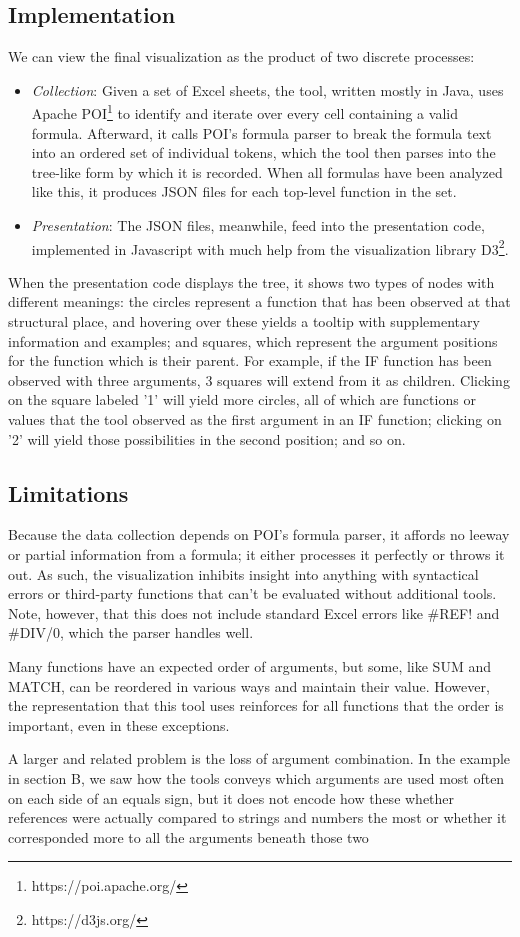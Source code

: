 \documentclass[conference]{IEEEtran}
\begin{document}
\subsection{Implementation}
We can view the final visualization as the product of two discrete processes:
\begin{itemize}
	\item \textit{Collection}: Given a set of Excel sheets, the tool, written mostly in Java, uses Apache POI\footnote{https://poi.apache.org/} to identify and iterate over every cell containing a valid formula. Afterward, it calls POI's formula parser to break the formula text into an ordered set of individual tokens, which the tool then parses into the tree-like form by which it is recorded. When all formulas have been analyzed like this, it produces JSON files for each top-level function in the set.
	\item \textit{Presentation}: The JSON files, meanwhile, feed into the presentation code, implemented in Javascript with much help from the visualization library D3\footnote{https://d3js.org/}. 
\end{itemize}
When the presentation code displays the tree, it shows two types of nodes with different meanings: the circles represent a function that has been observed at that structural place, and hovering over these yields a tooltip with supplementary information and examples; and squares, which represent the argument positions for the function which is their parent. For example, if the IF function has been observed with three arguments, 3 squares will extend from it as children. Clicking on the square labeled '1' will yield more circles, all of which are functions or values that the tool observed as the first argument in an IF function; clicking on '2' will yield those possibilities in the second position; and so on.



\subsection{Limitations}
Because the data collection depends on POI's formula parser, it affords no leeway or partial information from a formula; it either processes it perfectly or throws it out. As such, the visualization inhibits insight into anything with syntactical errors or third-party functions that can't be evaluated without additional tools. Note, however, that this does not include standard Excel errors like \#REF! and \#DIV/0, which the parser handles well. \par
Many functions have an expected order of arguments, but some, like SUM and MATCH, can be reordered in various ways and maintain their value. However, the representation that this tool uses reinforces for all functions that the order is important, even in these exceptions. \par
A larger and related problem is the loss of argument combination. In the example in section B, we saw how the tools conveys which arguments are used most often on each side of an equals sign, but it does not encode how these whether references were actually compared to strings and numbers the most or whether it corresponded more to all the arguments beneath those two 
\end{document}
